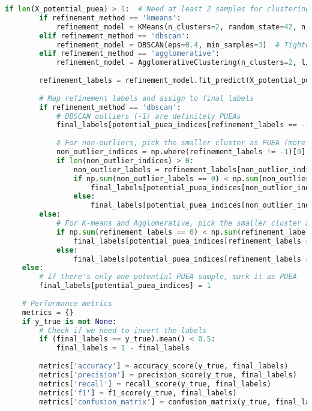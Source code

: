 \begin{lstlisting}[language=Python, caption=Iterative Clustering Implementation]
    if len(X_potential_puea) > 1:  # Need at least 2 samples for clustering
        if refinement_method == 'kmeans':
            refinement_model = KMeans(n_clusters=2, random_state=42, n_init=10)
        elif refinement_method == 'dbscan':
            refinement_model = DBSCAN(eps=0.4, min_samples=3)  # Tighter parameters for refinement
        elif refinement_method == 'agglomerative':
            refinement_model = AgglomerativeClustering(n_clusters=2, linkage='ward')
        
        refinement_labels = refinement_model.fit_predict(X_potential_puea)
        
        # Map refinement labels and assign to final labels
        if refinement_method == 'dbscan':
            # DBSCAN outliers (-1) are definitely PUEAs
            final_labels[potential_puea_indices[refinement_labels == -1]] = 1
            
            # For non-outliers, pick the smaller cluster as PUEA (more conservative approach)
            non_outlier_indices = np.where(refinement_labels != -1)[0]
            if len(non_outlier_indices) > 0:
                non_outlier_labels = refinement_labels[non_outlier_indices]
                if np.sum(non_outlier_labels == 0) < np.sum(non_outlier_labels == 1):
                    final_labels[potential_puea_indices[non_outlier_indices[non_outlier_labels == 0]]] = 1
                else:
                    final_labels[potential_puea_indices[non_outlier_indices[non_outlier_labels == 1]]] = 1
        else:
            # For K-means and Agglomerative, pick the smaller cluster as PUEA
            if np.sum(refinement_labels == 0) < np.sum(refinement_labels == 1):
                final_labels[potential_puea_indices[refinement_labels == 0]] = 1
            else:
                final_labels[potential_puea_indices[refinement_labels == 1]] = 1
    else:
        # If there's only one potential PUEA sample, mark it as PUEA
        final_labels[potential_puea_indices] = 1
    
    # Performance metrics
    metrics = {}
    if y_true is not None:
        # Check if we need to invert the labels
        if (final_labels == y_true).mean() < 0.5:
            final_labels = 1 - final_labels
            
        metrics['accuracy'] = accuracy_score(y_true, final_labels)
        metrics['precision'] = precision_score(y_true, final_labels)
        metrics['recall'] = recall_score(y_true, final_labels)
        metrics['f1'] = f1_score(y_true, final_labels)
        metrics['confusion_matrix'] = confusion_matrix(y_true, final_labels)
    

\end{lstlisting}
